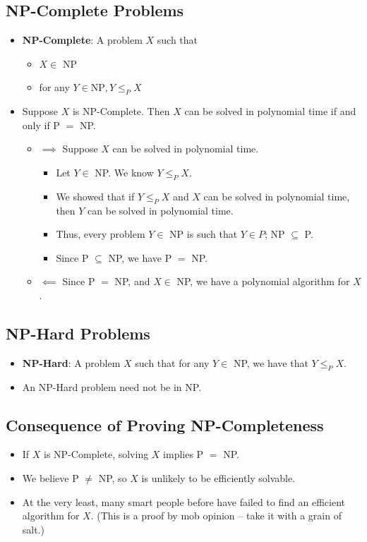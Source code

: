 \documentclass[12pt]{article}
\begin{document}
\subsection{NP-Complete Problems}
\begin{itemize}
    \item \textbf{NP-Complete}: A problem $X$ such that
    \begin{itemize}
        \item $X \in$ NP
        \item for any $Y \in \text{NP}, Y \leq_P X$
    \end{itemize}
    \item Suppose $X$ is NP-Complete. Then $X$ can be solved in polynomial time if and only if P $=$ NP.
    \begin{itemize}
        \item $\implies$ Suppose $X$ can be solved in polynomial time.
        \begin{itemize}
            \item Let $Y \in$ NP. We know $Y \leq_P X$.
            \item We showed that if $Y \leq_P X$ and $X$ can be solved in polynomial time, then $Y$ can be solved in polynomial time.
            \item Thus, every problem $Y \in$ NP is such that $Y \in P$; NP $\subseteq$ P.
            \item Since P $\subseteq$ NP, we have P $=$ NP.
        \end{itemize}
        \item $\impliedby$ Since P $=$ NP, and $X \in$ NP, we have a polynomial algorithm for $X$.
    \end{itemize}
\end{itemize}

\subsection{NP-Hard Problems}
\begin{itemize}
    \item \textbf{NP-Hard}: A problem $X$ such that for any $Y \in$ NP, we have that $Y \leq_P X$.
    \item An NP-Hard problem need not be in NP.
\end{itemize}

\subsection{Consequence of Proving NP-Completeness}
\begin{itemize}
    \item If $X$ is NP-Complete, solving $X$ implies P $=$ NP.
    \item We believe P $\neq$ NP, so $X$ is unlikely to be efficiently solvable.
    \item At the very least, many smart people before have failed to find an efficient algorithm for $X$. (This is a proof by mob opinion -- take it with a grain of salt.)
\end{itemize}
\end{document}
